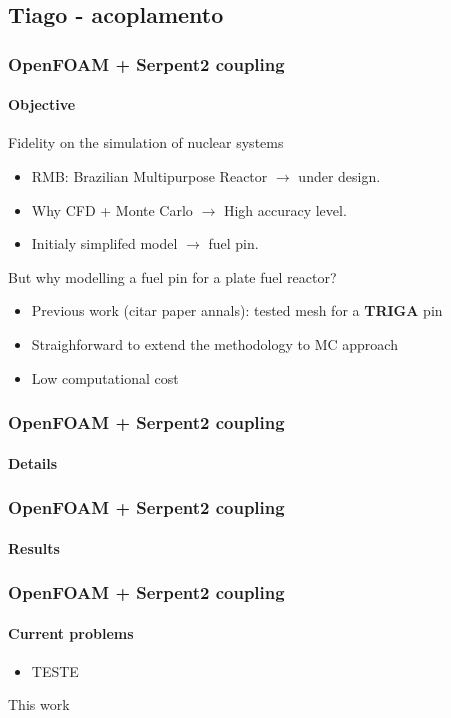 \documentclass[svgnames,smaller,table]{beamer}
\begin{document}
\subsection{Tiago - acoplamento}
\begin{frame}
  \frametitle{OpenFOAM + Serpent2 coupling}
  \framesubtitle{Objective}
  \begin{center}
    Fidelity on the simulation of nuclear systems\\
    \vspace{10px}
    \begin{itemize}
    \item RMB: Brazilian Multipurpose Reactor $\rightarrow$ under design.
    \item Why CFD + Monte Carlo $\rightarrow$ High accuracy level.
    \item Initialy simplifed model $\rightarrow$ fuel pin.
    \end{itemize}
    But why modelling a fuel pin for a plate fuel reactor?
    \begin{itemize}
    \item Previous work (citar paper annals): tested mesh for a \textbf{TRIGA} pin
    \item Straighforward to extend the methodology to MC approach
    \item Low computational cost
    \end{itemize}
  \end{center}
\end{frame}

\begin{frame}
  \frametitle{OpenFOAM + Serpent2 coupling}
  \framesubtitle{Details}
  \begin{center}
    
  \end{center}
\end{frame}

\begin{frame}
  \frametitle{OpenFOAM + Serpent2 coupling}
  \framesubtitle{Results}
  \begin{center}


  \end{center}
\end{frame}

\begin{frame}
  \frametitle{OpenFOAM + Serpent2 coupling}
  \framesubtitle{Current problems}
  \begin{center}
    \begin{itemize}
      \item TESTE
    \end{itemize}
    This work 
  \end{center}
\end{frame}
\end{document}
